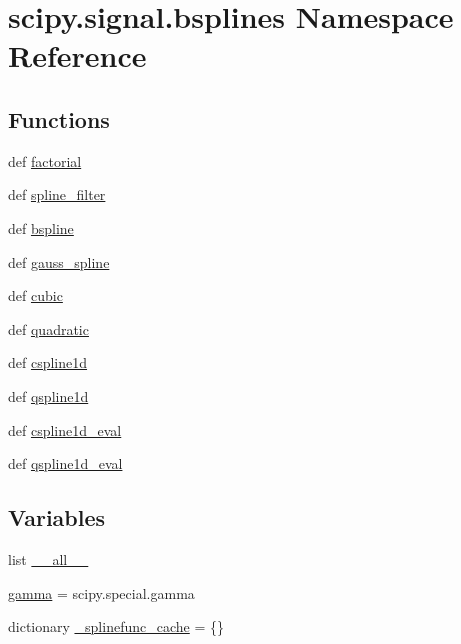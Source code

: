 \hypertarget{namespacescipy_1_1signal_1_1bsplines}{}\section{scipy.\+signal.\+bsplines Namespace Reference}
\label{namespacescipy_1_1signal_1_1bsplines}
\subsection*{Functions}
\begin{DoxyCompactItemize}
\item 
def \hyperlink{namespacescipy_1_1signal_1_1bsplines_aff07b3099fbd48c48a07ecd5b141ee64}{factorial}
\item 
def \hyperlink{namespacescipy_1_1signal_1_1bsplines_aa3813dae6525e98d6c1c98ce623b1b11}{spline\+\_\+filter}
\item 
def \hyperlink{namespacescipy_1_1signal_1_1bsplines_a1c2c072de31ef4fe84f6bf174ef0d9df}{bspline}
\item 
def \hyperlink{namespacescipy_1_1signal_1_1bsplines_ac7cae87ca2f19aa5460062b871fc4587}{gauss\+\_\+spline}
\item 
def \hyperlink{namespacescipy_1_1signal_1_1bsplines_a5a92dacd867fa4f97c3d8c597282a0f3}{cubic}
\item 
def \hyperlink{namespacescipy_1_1signal_1_1bsplines_a02da7df6bee0f452e6b657082911851d}{quadratic}
\item 
def \hyperlink{namespacescipy_1_1signal_1_1bsplines_a069f1ba3bbf708a14f60607ba16596f2}{cspline1d}
\item 
def \hyperlink{namespacescipy_1_1signal_1_1bsplines_a2769c05ea6e1a568107e68a89d1cd429}{qspline1d}
\item 
def \hyperlink{namespacescipy_1_1signal_1_1bsplines_a44dabc96958a9ff5b65cdc14f4be4f44}{cspline1d\+\_\+eval}
\item 
def \hyperlink{namespacescipy_1_1signal_1_1bsplines_a49fd11e262bc519bdc4b629e6a6fd690}{qspline1d\+\_\+eval}
\end{DoxyCompactItemize}
\subsection*{Variables}
\begin{DoxyCompactItemize}
\item 
list \hyperlink{namespacescipy_1_1signal_1_1bsplines_a245948568a8b033d93b5557b742932c9}{\+\_\+\+\_\+all\+\_\+\+\_\+}
\item 
\hyperlink{namespacescipy_1_1signal_1_1bsplines_a7f2e8ea608e042f8f0037f248fcd7eac}{gamma} = scipy.\+special.\+gamma
\item 
dictionary \hyperlink{namespacescipy_1_1signal_1_1bsplines_aeabca2856d3743b7d306ed99fc524b7d}{\+\_\+splinefunc\+\_\+cache} = \{\}
\end{DoxyCompactItemize}



